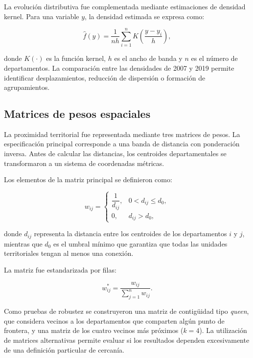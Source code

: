 La evolución distributiva fue complementada mediante estimaciones de densidad
kernel. Para una variable $y$, la densidad estimada se expresa como:

\begin{equation}
\widehat{f}(y)
=
\frac{1}{nh}
\sum_{i=1}^{n}
K\left(
\frac{y-y_i}{h}
\right),
\label{eq:densidad_kernel}
\end{equation}

donde $K(\cdot)$ es la función kernel, $h$ es el ancho de banda y $n$ es el
número de departamentos. La comparación entre las densidades de 2007 y 2019
permite identificar desplazamientos, reducción de dispersión o formación de
agrupamientos.

\subsection{Matrices de pesos espaciales}

La proximidad territorial fue representada mediante tres matrices de pesos. La
especificación principal corresponde a una banda de distancia con ponderación
inversa. Antes de calcular las distancias, los centroides departamentales se
transformaron a un sistema de coordenadas métricas.

Los elementos de la matriz principal se definieron como:

\begin{equation}
w_{ij}
=
\begin{cases}
\dfrac{1}{d_{ij}},
& 0<d_{ij}\leq d_0, \\[0.3cm]
0,
& d_{ij}>d_0,
\end{cases}
\label{eq:matriz_distancia}
\end{equation}

donde $d_{ij}$ representa la distancia entre los centroides de los
departamentos $i$ y $j$, mientras que $d_0$ es el umbral mínimo que garantiza
que todas las unidades territoriales tengan al menos una conexión.

La matriz fue estandarizada por filas:

\begin{equation}
w^{*}_{ij}
=
\frac{w_{ij}}
{\sum_{j=1}^{n}w_{ij}}.
\label{eq:estandarizacion_filas}
\end{equation}

Como pruebas de robustez se construyeron una matriz de contigüidad tipo
\textit{queen}, que considera vecinos a los departamentos que comparten algún
punto de frontera, y una matriz de los cuatro vecinos más próximos
($k=4$). La utilización de matrices alternativas permite evaluar si los
resultados dependen excesivamente de una definición particular de cercanía.

